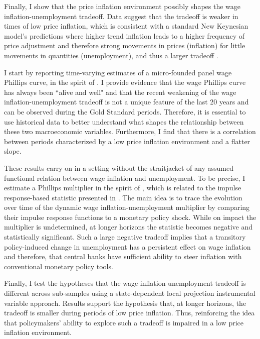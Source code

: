 \documentclass[12pt]{article}
\begin{document}
Finally, I show that the price inflation environment possibly shapes the wage inflation-unemployment tradeoff. Data suggest that the tradeoff is weaker in times of low price inflation, which is consistent with a standard New Keynesian model's predictions where higher trend inflation leads to a higher frequency of price adjustment and therefore strong movements in prices (inflation) for little movements in quantities (unemployment), and thus a larger tradeoff \citep{Benati2007}.

I start by reporting time-varying estimates of a micro-founded panel wage Phillips curve, in the spirit of \cite{Gali2011}. I provide evidence that the wage Phillips curve has always been ``alive and well" and that the recent weakening of the wage inflation-unemployment tradeoff is not a unique feature of the last 20 years and can be observed during the Gold Standard periods. Therefore, it is essential to use historical data to better understand what shapes the relationship between these two macroeconomic variables. Furthermore, I find that there is a correlation between periods characterized by a low price inflation environment and a flatter slope.

These results carry on in a setting without the straitjacket of any assumed functional relation between wage inflation and unemployment. To be precise, I estimate a Phillips multiplier in the spirit of \cite{Barnichon2019}, which is related to the impulse response-based statistic presented in \cite{Gali2019}. The main idea is to trace the evolution over time of the dynamic wage inflation-unemployment multiplier by comparing their impulse response functions to a monetary policy shock. While on impact the multiplier is undetermined, at longer horizons the statistic becomes negative and statistically significant. Such a large negative tradeoff implies that a transitory policy-induced change in unemployment has a persistent effect on wage inflation and therefore, that central banks have sufficient ability to steer inflation with conventional monetary policy tools.

Finally, I test the hypotheses that the wage inflation-unemployment tradeoff is different across sub-samples using a state-dependent local projection instrumental variable approach. Results support the hypothesis that, at longer horizons, the tradeoff is smaller during periods of low price inflation. Thus, reinforcing the idea that policymakers' ability to explore such a tradeoff is impaired in a low price inflation environment.
\end{document}
